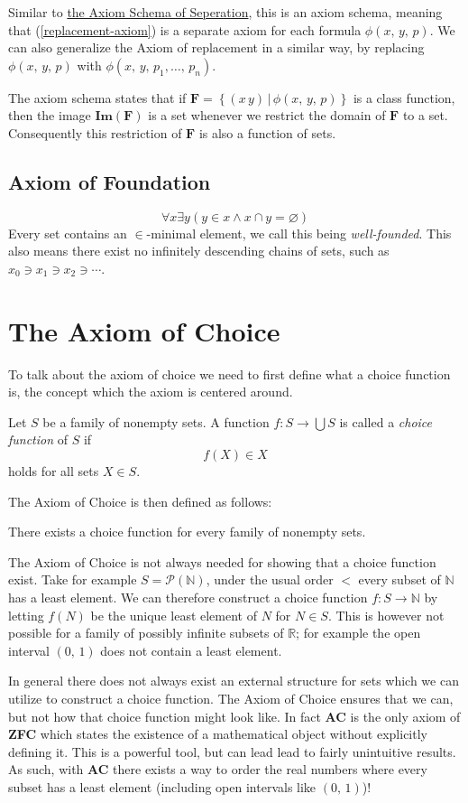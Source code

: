 \documentclass[../../main.tex]{subfiles}
\begin{document}
Similar to \hyperref[ZF3]{the Axiom Schema of Seperation}, this is an axiom schema, meaning that (\ref{replacement-axiom}) is a separate axiom for each formula $\phi(x,\, y,\, p)$.
We can also generalize the Axiom of replacement in a similar way, by replacing $\phi(x,\, y,\, p)$ with $\phi(x,\, y,\, p_1,\ldots,\, p_n)$.

The axiom schema states that if $\mathbf{F} = \left\{(x\, y) \,\vert\, \phi(x,\, y,\, p)\right\}$ is a class function,
then the image $\mathbf{Im}(\mathbf{F})$ is a set whenever we restrict the domain of $\mathbf{F}$ to a set.
Consequently this restriction of $\mathbf{F}$ is also a function of sets. \cite[p.11]{Jec78}

\subsection{Axiom of Foundation}
$$\forall x \exists y \left(y \in x \wedge x \cap y = \varnothing \right)$$
Every set contains an $\in$-minimal element, we call this being \textit{well-founded}.\cite[p.92]{Gol17}
This also means there exist no infinitely descending chains of sets, such as $x_0 \ni x_1 \ni x_2 \ni \cdots$.\cite[Theorem 4.3, p.95]{Gol17}

\section{The Axiom of Choice}
To talk about the axiom of choice we need to first define what a choice function is, the concept which the axiom is centered around.
\begin{definition}\cite[p.38]{Jec78}
    Let $S$ be a family of nonempty sets.
    A function $f: S \to \bigcup S$ is called a \textit{choice function} of $S$ if
    $$f(X) \in X$$
    holds for all sets $X \in S$.
\end{definition}
The Axiom of Choice is then defined as follows:
\begin{definition}\cite[p.38]{Jec78}
    There exists a choice function for every family of nonempty sets.
\end{definition}

The Axiom of Choice is not always needed for showing that a choice function exist.
Take for example $S = \mathcal{P}(\mathbb{N})$, under the usual order $<$ every subset of $\mathbb{N}$ has a least element.
We can therefore construct a choice function $f: S \to \mathbb{N}$ by letting $f(N)$ be the unique least element of $N$ for $N \in S$.
This is however not possible for a family of possibly infinite subsets of $\mathbb{R}$; for example the open interval $\left(0,\, 1\right)$ does not contain a least element.

In general there does not always exist an external structure for sets which we can utilize to construct a choice function.
The Axiom of Choice ensures that we can, but not how that choice function might look like.
In fact \textbf{AC} is the only axiom of \textbf{ZFC} which states the existence of a mathematical object without explicitly defining it.
This is a powerful tool, but can lead lead to fairly unintuitive results. 
As such, with \textbf{AC} there exists a way to order the real numbers where every subset has a least element (including open intervals like $\left(0,\, 1\right)$)!
\end{document}
